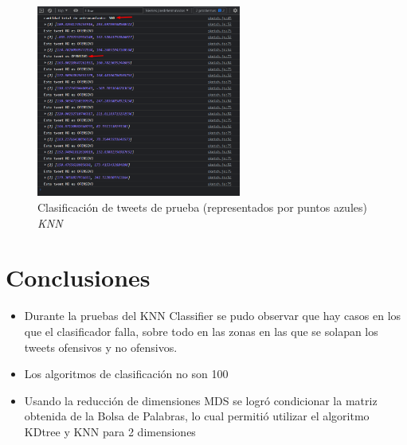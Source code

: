 \documentclass{article}
\begin{document}
\begin{figure}[h!]
	\centering
	\includegraphics[width=0.6\textwidth]{img/knn_06.png}
	\caption{Clasificación de tweets de prueba (representados por puntos azules) \textit{KNN}}
	\label{fig:knn_06}
\end{figure}

\clearpage
\section{Conclusiones}
\begin{itemize}
	\item Durante la pruebas del KNN Classifier se pudo observar que hay casos en los que el clasificador falla, sobre todo en las zonas en las que se solapan los tweets ofensivos y no ofensivos.
	\item Los algoritmos de clasificación no son 100%
	\item Usando la reducción de dimensiones MDS se logró condicionar la matriz obtenida de la Bolsa de Palabras, lo cual permitió utilizar el algoritmo KDtree y KNN para 2 dimensiones
	
\end{itemize}
\end{document}

